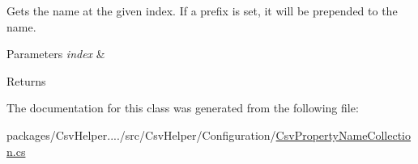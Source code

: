 Gets the name at the given index. If a prefix is set, it will be prepended to the name. 


\begin{DoxyParams}{Parameters}
{\em index} & \\
\hline
\end{DoxyParams}
\begin{DoxyReturn}{Returns}

\end{DoxyReturn}


The documentation for this class was generated from the following file\-:\begin{DoxyCompactItemize}
\item 
packages/\-Csv\-Helper..../src/\-Csv\-Helper/\-Configuration/\hyperlink{a00191}{Csv\-Property\-Name\-Collection.\-cs}\end{DoxyCompactItemize}
